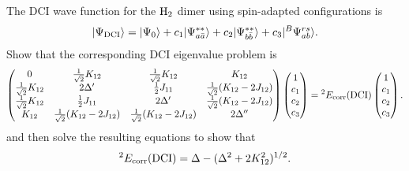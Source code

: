 \documentclass[a4paper]{book}
\newcounter{exercise}[chapter]
\newcommand{\corr}{{\rm corr}}
\newcommand{\DCI}{{\rm DCI}}
\begin{document}
	\begin{exercise}
	The DCI wave function for the $\ce{H2}$ dimer using spin-adapted configurations is
	\[
		| \Psi_{\DCI} \rangle = | \Psi_0 \rangle + c_1 | \Psi^{**}_{a\bar{a}} \rangle + c_2 | \Psi^{**}_{b \bar{b}} \rangle + c_3 | {}^{B}\Psi^{rs}_{ab} \rangle .
	\]
	Show that the corresponding DCI eigenvalue problem is
	\[
	\begin{pmatrix}
		0 & \frac{1}{\sqrt{2}}K_{12} & \frac{1}{\sqrt{2}} K_{12} & K_{12} \\
		\frac{1}{\sqrt{2}}K_{12} & 2\Delta^\prime & \frac{1}{2}J_{11} & \frac{1}{\sqrt{2}}(K_{12} - 2 J_{12}) \\
		\frac{1}{\sqrt{2}}K_{12} & \frac{1}{2}J_{11} & 2\Delta^\prime & \frac{1}{\sqrt{2}}(K_{12} - 2 J_{12}) \\
		K_{12} & \frac{1}{\sqrt{2}}(K_{12} - 2J_{12}) & \frac{1}{\sqrt{2}}(K_{12} - 2J_{12}) & 2\Delta^{\prime\prime}
	\end{pmatrix} \begin{pmatrix}
	1 \\ c_1 \\ c_2 \\ c_3
	\end{pmatrix} = {}^2 E_\corr (\DCI) \begin{pmatrix}
	1 \\ c_1 \\ c_2 \\ c_3
	\end{pmatrix}.
	\]
	and then solve the resulting equations to show that
	\[
		{}^2 E_\corr (\DCI) = \Delta - ( \Delta^2 + 2 K^2_{12} )^{1/2}.
	\]
	\end{exercise}
	
\end{document}
